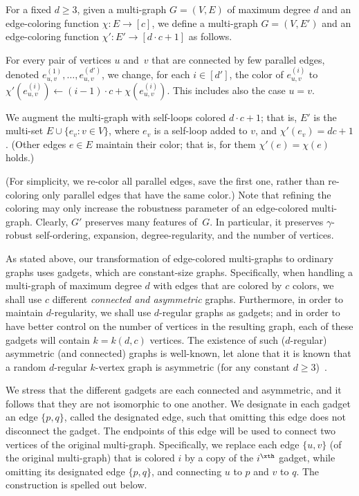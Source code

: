 \label{pre-colored2standard:ct}
For a fixed $d\geq3$,
given a multi-graph $G=(V,E)$ of maximum degree $d$
and an edge-coloring function $\chi\!:\!E\!\to\![c]$,
we define a multi-graph $G=(V,E')$ and
an edge-coloring function $\chi'\!:\!E'\!\to\![d\cdot c+1]$ as follows.
\BE
\item For every pair of vertices $u$ and~$v$ that are connected
by few parallel edges, denoted $e^{(1)}_{u,v},\ldots,e^{(d')}_{u,v}$,
we change, for each $i\in[d']$, the color of $e^{(i)}_{u,v}$
to $\chi'(e^{(i)}_{u,v})\gets(i-1)\cdot c+\chi(e^{(i)}_{u,v})$.
This includes also the case $u=v$.
\item We augment the multi-graph with self-loops colored $d\cdot c+1$;
that is, $E'$ is the multi-set $E\cup\{e_v:v\!\in\!V\}$,
where $e_v$ is a self-loop added to $v$, and $\chi'(e_v)=dc+1$.
\EE
{\rm(Other edges $e\!\in\!E$ maintain their color;
that is, for them $\chi'(e)=\chi(e)$ holds.)}
\ECT

(For simplicity, we re-color all parallel edges, save the first one,
rather than re-coloring only parallel edges that have the same color.)
Note that refining the coloring may only increase
the robustness parameter of an edge-colored multi-graph.
Clearly, $G'$ preserves many features of~$G$.
In particular, it preserves $\gamma$-robust self-ordering,
expansion, degree-regularity, and the number of vertices.

As stated above, our transformation of edge-colored multi-graphs
to ordinary graphs uses gadgets, which are constant-size graphs.
Specifically, when handling a multi-graph of maximum degree $d$
with edges that are colored by $c$ colors,
we shall use $c$ different {\em connected and asymmetric}\/ graphs.
Furthermore, in order to maintain $d$-regularity,
we shall use $d$-regular graphs as gadgets;
and in order to have better control on the number
of vertices in the resulting graph,
each of these gadgets will contain $k=k(d,c)$ vertices.
The existence of such ($d$-regular) asymmetric (and connected) graphs
is well-known, let alone that it is known that
a random $d$-regular $k$-vertex graph is asymmetric
(for any constant $d\geq3$)~\cite{B1,B2}.

We stress that the different gadgets are
each connected and asymmetric,
and it follows that they are not isomorphic to one another.
We designate in each gadget an edge $\{p,q\}$,
called the {\sf designated edge},
such that omitting this edge does not disconnect the gadget.
The endpoints of this edge
will be used to connect two vertices of the original multi-graph.
Specifically, we replace each edge $\{u,v\}$ (of the original multi-graph)
that is colored $i$ by a copy of the $i^\xth$ gadget,
while omitting its designated edge $\{p,q\}$,
and connecting $u$ to $p$ and $v$ to $q$.
The construction is spelled out below.

